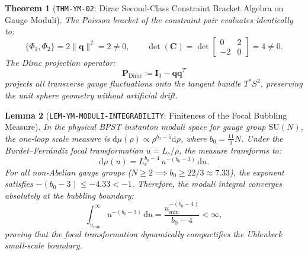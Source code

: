\documentclass[11pt,a4paper,reqno]{article}
\theoremstyle{plain}
\newtheorem{theorem}{Theorem}[section]
\newtheorem{lemma}[theorem]{Lemma}
\theoremstyle{definition}
\theoremstyle{remark}
\numberwithin{equation}{section}
\providecommand{\diff}{\mathrm{d}}
\begin{document}
\begin{theorem}[\texttt{THM-YM-02}: Dirac Second-Class Constraint Bracket Algebra on Gauge Moduli]
\label{thm:ym_dirac_bracket}
The Poisson bracket of the constraint pair evaluates identically to:
\begin{equation}
  \{\Phi_1, \Phi_2\} = 2 \|\mathbf{q}\|^2 = 2 \ne 0, \qquad \det(\mathbf{C}) = \det \begin{bmatrix} 0 & 2 \\ -2 & 0 \end{bmatrix} = 4 \ne 0.
\end{equation}
The Dirac projection operator:
\begin{equation}
  \mathbf{P}_{\mathrm{Dirac}} \coloneqq \mathbf{I}_3 - \mathbf{q}\mathbf{q}^T
\end{equation}
projects all transverse gauge fluctuations onto the tangent bundle $T^*S^2$, preserving the unit sphere geometry without artificial drift.
\end{theorem}

\begin{lemma}[\texttt{LEM-YM-MODULI-INTEGRABILITY}: Finiteness of the Focal Bubbling Measure]
\label{lem:ym_moduli_measure}
In the physical BPST instanton moduli space for gauge group $\mathrm{SU}(N)$, the one-loop scale measure is $\diff\mu(\rho) \propto \rho^{b_0 - 5} \diff\rho$, where $b_0 = \frac{11}{3}N$. Under the Burdet--Ferr\'andiz focal transformation $u = L_c/\rho$, the measure transforms to:
\begin{equation}
  \diff\mu(u) = L_c^{b_0 - 4} \, u^{-(b_0 - 3)} \, \diff u.
\end{equation}
For all non-Abelian gauge groups ($N \ge 2 \implies b_0 \ge 22/3 \approx 7.33$), the exponent satisfies $-(b_0 - 3) \le -4.33 < -1$. Therefore, the moduli integral converges absolutely at the bubbling boundary:
\begin{equation}
  \int_{u_{\mathrm{min}}}^\infty u^{-(b_0 - 3)} \, \diff u = \frac{u_{\mathrm{min}}^{-(b_0 - 4)}}{b_0 - 4} < \infty,
\end{equation}
proving that the focal transformation dynamically compactifies the Uhlenbeck small-scale boundary.
\end{lemma}
\end{document}
